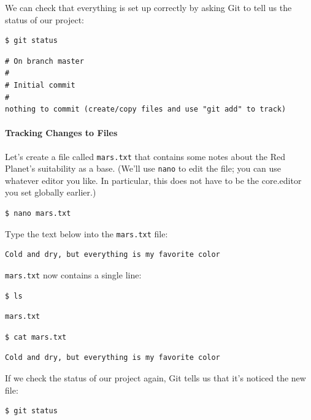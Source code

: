 \documentclass{book}
\begin{document}
We can check that everything is set up correctly by asking Git to tell
us the status of our project:

\begin{verbatim}
$ git status
\end{verbatim}

\begin{verbatim}
# On branch master
#
# Initial commit
#
nothing to commit (create/copy files and use "git add" to track)
\end{verbatim}

\mbox{}\paragraph{Tracking Changes to Files}

Let's create a file called \texttt{mars.txt} that contains some notes
about the Red Planet's suitability as a base. (We'll use \texttt{nano}
to edit the file; you can use whatever editor you like. In particular,
this does not have to be the core.editor you set globally earlier.)

\begin{verbatim}
$ nano mars.txt
\end{verbatim}

Type the text below into the \texttt{mars.txt} file:

\begin{verbatim}
Cold and dry, but everything is my favorite color
\end{verbatim}

\texttt{mars.txt} now contains a single line:

\begin{verbatim}
$ ls
\end{verbatim}

\begin{verbatim}
mars.txt
\end{verbatim}

\begin{verbatim}
$ cat mars.txt
\end{verbatim}

\begin{verbatim}
Cold and dry, but everything is my favorite color
\end{verbatim}

If we check the status of our project again, Git tells us that it's
noticed the new file:

\begin{verbatim}
$ git status
\end{verbatim}
\end{document}
